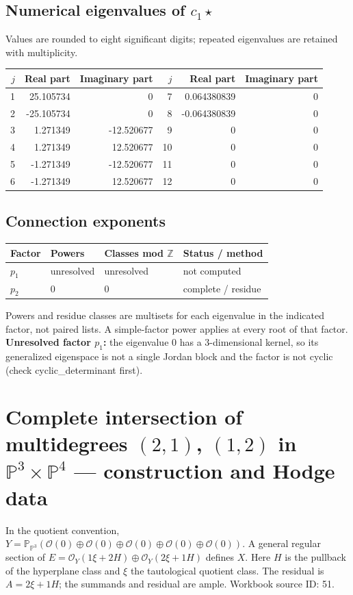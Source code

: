 \documentclass[10pt,a4paper]{article}
\begin{document}
\subsection*{Numerical eigenvalues of $c_1\star$}
Values are rounded to eight significant digits; repeated eigenvalues are retained with multiplicity.
\begin{center}\small\begin{tabular}{rrr@{\qquad}rrr}\toprule $j$ & Real part & Imaginary part & $j$ & Real part & Imaginary part\\\midrule
1 & 25.105734 & 0 & 7 & 0.064380839 & 0\\
2 & -25.105734 & 0 & 8 & -0.064380839 & 0\\
3 & 1.271349 & -12.520677 & 9 & 0 & 0\\
4 & 1.271349 & 12.520677 & 10 & 0 & 0\\
5 & -1.271349 & -12.520677 & 11 & 0 & 0\\
6 & -1.271349 & 12.520677 & 12 & 0 & 0\\
\bottomrule\end{tabular}\end{center}
\subsection*{Connection exponents}
\begin{center}\begin{tabular}{llll}\toprule Factor & Powers & Classes mod $\mathbb Z$ & Status / method\\\midrule
$p_{1}$ & unresolved & unresolved & not computed\\
$p_{2}$ & $0$ & $0$ & complete / residue\\
\bottomrule\end{tabular}\end{center}
Powers and residue classes are multisets for each eigenvalue in the indicated factor, not paired lists. A simple-factor power applies at every root of that factor.
\textbf{Unresolved factor $p_{1}$:} the eigenvalue 0 has a 3-dimensional kernel, so its generalized eigenspace is not a single Jordan block and the factor is not cyclic (check cyclic\_determinant first).
\clearpage\section*{Complete intersection of multidegrees $(2,1)$, $(1,2)$ in $\mathbb P^{3}\times \mathbb P^{4}$ --- construction and Hodge data}\label{entry:PB5-051}
In the quotient convention, $Y=\mathbb P_{\mathbb P^{3}}(\mathcal O(0)\oplus\mathcal O(0)\oplus\mathcal O(0)\oplus\mathcal O(0)\oplus\mathcal O(0))$.
A general regular section of $E=\mathcal O_Y(1\xi+2H)\oplus\mathcal O_Y(2\xi+1H)$ defines $X$.
Here $H$ is the pullback of the hyperplane class and $\xi$ the tautological quotient class. The residual is $A=2\xi+1H$; the summands and residual are ample.
Workbook source ID: 51.
\end{document}
